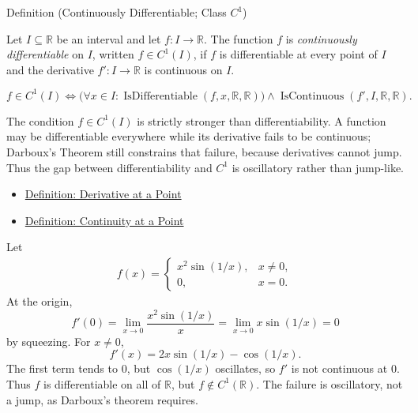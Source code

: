 \begin{definitionbox}{Definition (Continuously Differentiable; Class \(C^1\))}
\begin{definition}
\label{def:class-c1}
Let \(I\subseteq\mathbb{R}\) be an interval and let \(f:I\to\mathbb{R}\). The function \(f\) is \emph{continuously differentiable} on \(I\), written \(f\in C^1(I)\), if \(f\) is differentiable at every point of \(I\) and the derivative \(f':I\to\mathbb{R}\) is continuous on \(I\).
\end{definition}
\end{definitionbox}

\begin{remark*}
\[
  f\in C^1(I)
  \Longleftrightarrow
  \bigl(\forall x\in I:\operatorname{IsDifferentiable}(f,x,\mathbb{R},\mathbb{R})\bigr)
  \land
  \operatorname{IsContinuous}(f',I,\mathbb{R},\mathbb{R}).
\]
\end{remark*}

\begin{remark*}[Interpretation]
The condition \(f\in C^1(I)\) is strictly stronger than differentiability. A function may be differentiable everywhere while its derivative fails to be continuous; Darboux's Theorem still constrains that failure, because derivatives cannot jump. Thus the gap between differentiability and \(C^1\) is oscillatory rather than jump-like.
\end{remark*}

\begin{dependencies}
\begin{itemize}
  \item \hyperref[def:derivative-at-a-point]{Definition: Derivative at a Point}
  \item \hyperref[def:continuous-at-point]{Definition: Continuity at a Point}
\end{itemize}
\end{dependencies}

\begin{exposition}
\label{ex:x2sin}
Let
\[
\begin{aligned}
  f(x)=
  \begin{cases}
    x^2\sin(1/x), & x\neq 0,\\
    0, & x=0.
  \end{cases}
\end{aligned}
\]
At the origin,
\[
  f'(0)=\lim_{x\to0}\frac{x^2\sin(1/x)}{x}
  =
  \lim_{x\to0}x\sin(1/x)=0
\]
by squeezing. For \(x\neq0\),
\[
  f'(x)=2x\sin(1/x)-\cos(1/x).
\]
The first term tends to \(0\), but \(\cos(1/x)\) oscillates, so \(f'\) is
not continuous at \(0\). Thus \(f\) is differentiable on all of
\(\mathbb{R}\), but \(f\notin C^1(\mathbb{R})\). The failure is oscillatory,
not a jump, as Darboux's theorem requires.
\end{exposition}

